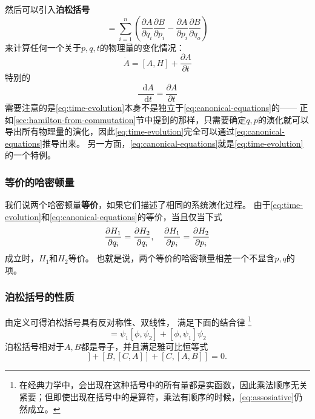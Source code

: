 \documentclass[UTF8, a4paper]{ctexart}
\newcommand*{\diff}{\mathop{}\!\mathrm{d}}
\begin{document}
然后可以引入\textbf{泊松括号}
\begin{equation}
    [A, B] = \sum_{i=1}^n \left(\frac{\partial A}{\partial q_i} \frac{\partial B}{\partial p_i} 
    - \frac{\partial A}{\partial p_i}\frac{\partial B}{\partial q_o}\right)
\end{equation}
来计算任何一个关于$p, q, t$的物理量的变化情况：
\begin{equation}
    \dot{A} = [A, H] + \frac{\partial A}{\partial t}
    \label{eq:time-evolution}
\end{equation}
特别的
\begin{equation}
    \frac{\diff A}{\diff t} = \frac{\partial A}{\partial t}
\end{equation}
需要注意的是\eqref{eq:time-evolution}本身不是独立于\eqref{eq:canonical-equations}的——
正如\ref{sec:hamilton-from-commutation}节中提到的那样，只需要确定$q,p$的演化就可以导出所有物理量的演化，因此\eqref{eq:time-evolution}完全可以通过\eqref{eq:canonical-equations}推导出来。
另一方面，\eqref{eq:canonical-equations}就是\eqref{eq:time-evolution}的一个特例。

\subsubsection{等价的哈密顿量}

我们说两个哈密顿量\textbf{等价}，如果它们描述了相同的系统演化过程。
由于\eqref{eq:time-evolution}和\eqref{eq:canonical-equations}的等价，当且仅当下式
\begin{equation}
    \pdv{H_1}{q_i} = \pdv{H_2}{q_i}, \quad \pdv{H_1}{p_i} = \pdv{H_2}{p_i}
\end{equation}
成立时，$H_1$和$H_2$等价。
也就是说，两个等价的哈密顿量相差一个不显含$p, q$的项。

\subsubsection{泊松括号的性质}

由定义可得泊松括号具有反对称性、双线性，
满足下面的结合律%
\footnote{在经典力学中，会出现在这种括号中的所有量都是实函数，因此乘法顺序无关紧要；但即使出现在括号中的是算符，乘法有顺序的时候，\eqref{eq:assosiative}仍然成立。}
\begin{equation}
    [\phi, \psi_1 \psi_2] = \psi_1 [\phi, \psi_2] + [\phi, \psi_1] \psi_2
    \label{eq:assosiative}
\end{equation}
泊松括号相对于$A,B$都是导子，并且满足雅可比恒等式
\begin{equation}
    [A, [B, C]] + [B, [C, A]] + [C, [A, B]] = 0.
\end{equation}
\end{document}
